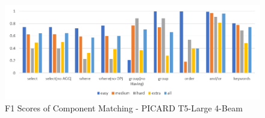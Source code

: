 

\begin{figure}[h]
    \centering
    \includegraphics[width=1\textwidth]{pics/ez/F1.png}
    \caption{F1 Scores of Component Matching - PICARD T5-Large 4-Beam}
\end{figure}
